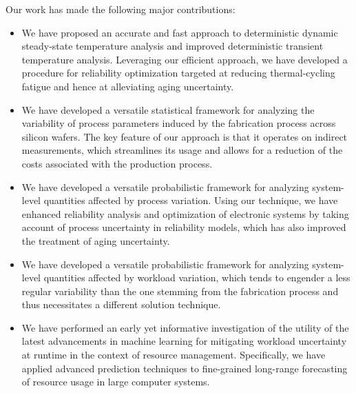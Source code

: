 Our work has made the following major contributions:

\begin{itemize}

\item
We have proposed an accurate and fast approach to deterministic dynamic
steady-state temperature analysis and improved deterministic transient
temperature analysis. Leveraging our efficient approach, we have developed a
procedure for reliability optimization targeted at reducing thermal-cycling
fatigue and hence at alleviating aging uncertainty.

\item
We have developed a versatile statistical framework for analyzing the
variability of process parameters induced by the fabrication process across
silicon wafers. The key feature of our approach is that it operates on indirect
measurements, which streamlines its usage and allows for a reduction of the
costs associated with the production process.

\item
We have developed a versatile probabilistic framework for analyzing system-level
quantities affected by process variation. Using our technique, we have enhanced
reliability analysis and optimization of electronic systems by taking account of
process uncertainty in reliability models, which has also improved the treatment
of aging uncertainty.

\item
We have developed a versatile probabilistic framework for analyzing system-level
quantities affected by workload variation, which tends to engender a less
regular variability than the one stemming from the fabrication process and thus
necessitates a different solution technique.

\item
We have performed an early yet informative investigation of the utility of the
latest advancements in machine learning for mitigating workload uncertainty at
runtime in the context of resource management. Specifically, we have applied
advanced prediction techniques to fine-grained long-range forecasting of
resource usage in large computer systems.

\end{itemize}
